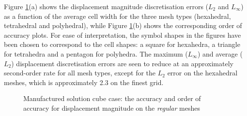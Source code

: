 \documentclass[sn-mathphys,Numbered]{sn-jnl}%
\begin{document}
Figure \ref{fig:mms_disp_accuracy}(a) shows the displacement magnitude discretisation errors ($L_2$ and $L_\infty$) as a function of the average cell width for the three mesh types (hexahedral, tetrahedral and polyhedral), while Figure \ref{fig:mms_disp_accuracy}(b) shows the corresponding order of accuracy plots.
For ease of interpretation, the symbol shapes in the figures have been chosen to correspond to the cell shapes: a square for hexahedra, a triangle for tetrahedra and a pentagon for polyhedra.
The maximum ($L_\infty$) and average ($L_2$) displacement discretisation errors are seen to reduce at an approximately second-order rate for all mesh types, except for the $L_2$ error on the hexahedral meshes, which is approximately 2.3 on the finest grid.
\begin{figure}[htbp]
	\centering
	\caption{Manufactured solution cube case: the accuracy and order of accuracy for displacement magnitude on the \emph{regular} meshes}
	\label{fig:mms_disp_accuracy}
\end{figure}
\end{document}
